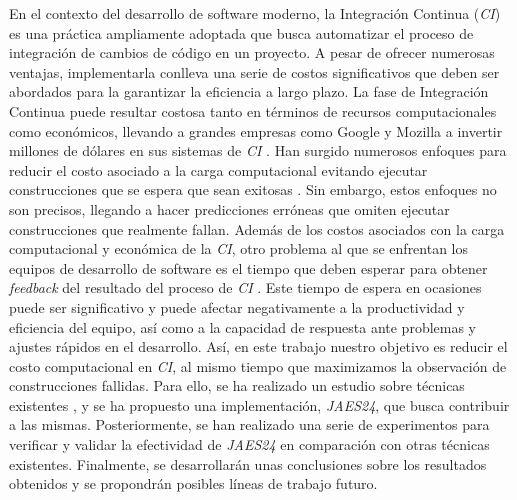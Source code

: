 En el contexto del desarrollo de software moderno, la Integración Continua (\textit{CI}) es una 
práctica ampliamente adoptada que busca automatizar el proceso de integración de cambios de código
en un proyecto. A pesar de ofrecer numerosas ventajas, implementarla conlleva una serie de costos
significativos que deben ser abordados para la garantizar la eficiencia a largo plazo. La fase de
Integración Continua puede resultar costosa tanto en términos de recursos computacionales como
económicos, llevando a grandes empresas como Google y Mozilla a invertir millones de dólares en
sus sistemas de \textit{CI} \cite{1}. Han surgido numerosos enfoques para reducir el costo asociado
a la carga computacional evitando ejecutar construcciones que se espera que sean exitosas
\cite{2}. Sin embargo, estos enfoques no son precisos, llegando a  hacer predicciones erróneas que
omiten ejecutar construcciones que realmente fallan. Además de los costos asociados con la carga
computacional y económica de la \textit{CI}, otro problema al que se enfrentan los equipos de
desarrollo de software es el tiempo que deben esperar para obtener \textit{feedback} del
resultado del proceso de \textit{CI} \cite{3}. Este tiempo de espera en ocasiones puede ser
significativo y puede afectar negativamente a la productividad y eficiencia del equipo, así como
a la capacidad de respuesta ante problemas y ajustes rápidos en el desarrollo. Así, en este
trabajo nuestro objetivo es reducir el costo computacional en \textit{CI}, al mismo tiempo que
maximizamos la observación de construcciones fallidas. Para ello, se ha realizado un estudio
sobre técnicas existentes \cite{2,4,5,6,7,8}, y se ha propuesto una implementación, \textit{JAES24},
que busca contribuir a las mismas. Posteriormente, se han realizado una serie de experimentos para
verificar y validar la efectividad de \textit{JAES24} en comparación con otras técnicas existentes.
Finalmente, se desarrollarán unas conclusiones sobre los resultados obtenidos y se propondrán
posibles líneas de trabajo futuro.

\vspace{0.5cm}

\vspace{2cm}

